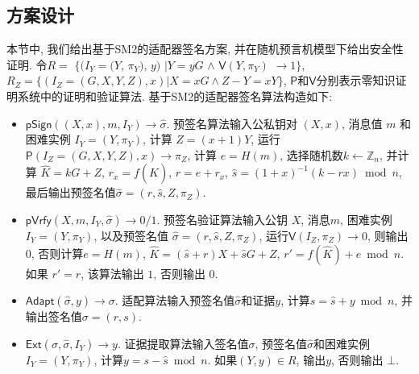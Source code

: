 \documentclass[review]{jcr}
\begin{document}
\subsection{方案设计}

本节中, 我们给出基于SM2的适配器签名方案, 并在随机预言机模型下给出安全性证明. 令$R=$ $\{$$(I_Y=(Y$, $\pi_Y)$, $y)$ $| Y = yG$ $\wedge$ $\mathsf{V}(Y, \pi_Y)$ $\rightarrow 1\}$, $R_Z= \{(I_Z=(G,X,Y,Z),x) | X = xG \wedge Z-Y=xY\}$, $\mathsf{P}$和$\mathsf{V}$分别表示零知识证明系统中的证明和验证算法. 基于SM2的适配器签名算法构造如下: 

\begin{itemize}

\item $\mathsf{pSign}((X,x),m,I_Y)\rightarrow \hat{\sigma}$. 预签名算法输入公私钥对 $(X,x)$, 消息值 $m$ 和困难实例 $I_Y=(Y, \pi_Y)$, 计算 $Z=(x+1)Y$, 运行 $\mathsf{P}(I_Z=(G,X,Y,Z),x)\rightarrow \pi_Z$, 计算 $e=H(m)$, 选择随机数$k\leftarrow \mathbb{Z}_n$, 并计算 $\hat{K}=kG+Z$, $r_x=f(\hat{K})$, $r=e+r_x$, $\hat{s}=(1+x)^{-1}(k-rx) \bmod n$, 最后输出预签名值$\hat{\sigma}=(r,\hat{s}, Z, \pi_Z)$.

\item $\mathsf{pVrfy}(X,m,I_Y,\hat{\sigma})\rightarrow 0/1$. 预签名验证算法输入公钥 $X$, 消息$m$, 困难实例$I_Y=(Y, \pi_Y)$, 以及预签名值 $\hat{\sigma}=(r,\hat{s}, Z, \pi_Z)$,  运行$\mathsf{V}(I_Z,\pi_Z)\rightarrow 0$, 则输出 $0$, 否则计算$e=H(m)$, $\hat{K}=(\hat{s}+r)X+\hat{s}G+Z$, $r'=f(\hat{K})+e \bmod n$. 如果 $r'=r$, 该算法输出 $1$, 否则输出 $0$. 

\item $\mathsf{Adapt}(\hat{\sigma},y)\rightarrow \sigma$. 适配算法输入预签名值$\hat{\sigma}$和证据$y$, 计算$s=\hat{s}+y \bmod n$, 并输出签名值$\sigma=(r,s)$. 

\item $\mathsf{Ext}(\sigma,\hat{\sigma},I_Y)\rightarrow y$. 证据提取算法输入签名值$\sigma$, 预签名值$\hat{\sigma}$和困难实例$I_{Y}=(Y, \pi_Y)$, 计算$y=s-\hat{s} \bmod n$. 如果$(Y, y)\in R$, 输出$y$, 否则输出 $\bot$. 
\end{itemize}
\ 
\end{document}
